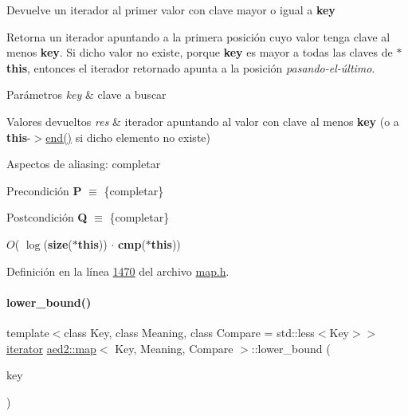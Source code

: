 Devuelve un iterador al primer valor con clave mayor o igual a {\bfseries key} 

Retorna un iterador apuntando a la primera posición cuyo valor tenga clave al menos {\bfseries key}. Si dicho valor no existe, porque {\bfseries key} es mayor a todas las claves de {\bfseries $\ast$this}, entonces el iterador retornado apunta a la posición {\itshape pasando-\/el-\/último}.


\begin{DoxyParams}{Parámetros}
{\em key} & clave a buscar \\
\hline
\end{DoxyParams}

\begin{DoxyRetVals}{Valores devueltos}
{\em res} & iterador apuntando al valor con clave al menos {\bfseries key} (o a {\bfseries this}-\/$>$\hyperlink{classaed2_1_1map_a76023e6a56cb625513e1b5ea028bf983_a76023e6a56cb625513e1b5ea028bf983}{end()} si dicho elemento no existe)\\
\hline
\end{DoxyRetVals}
\begin{DoxyParagraph}{Aspectos de aliasing\+:}
completar
\end{DoxyParagraph}
\begin{DoxyPrecond}{Precondición}
{\bfseries P} $\equiv$ \{completar\} 
\end{DoxyPrecond}
\begin{DoxyPostcond}{Postcondición}
{\bfseries Q} $\equiv$ \{completar\}
\end{DoxyPostcond}

\begin{DoxyDescription}
\item[Complejidad Temporal]$O$( $\log$({\bfseries size}({\bfseries $\ast$this})) $\cdot$ {\bfseries cmp}({\bfseries $\ast$this}))
\end{DoxyDescription}

Definición en la línea \hyperlink{map_8h_source_l01470}{1470} del archivo \hyperlink{map_8h_source}{map.\+h}.

\mbox{\label{classaed2_1_1map_a07b3dd65557c59ee085e5f211269c6b3_a07b3dd65557c59ee085e5f211269c6b3}} 
\paragraph{\texorpdfstring{lower\+\_\+bound()}{lower\_bound()}\hspace{0.1cm}{\footnotesize\ttfamily [2/2]}}
{\footnotesize\ttfamily template$<$class Key, class Meaning, class Compare = std\+::less$<$\+Key$>$$>$ \\
\hyperlink{classaed2_1_1map_1_1iterator}{iterator} \hyperlink{classaed2_1_1map}{aed2\+::map}$<$ Key, Meaning, Compare $>$\+::lower\+\_\+bound (\begin{DoxyParamCaption}\item[{const Key \&}]{key }\end{DoxyParamCaption})\hspace{0.3cm}{\ttfamily [inline]}}


